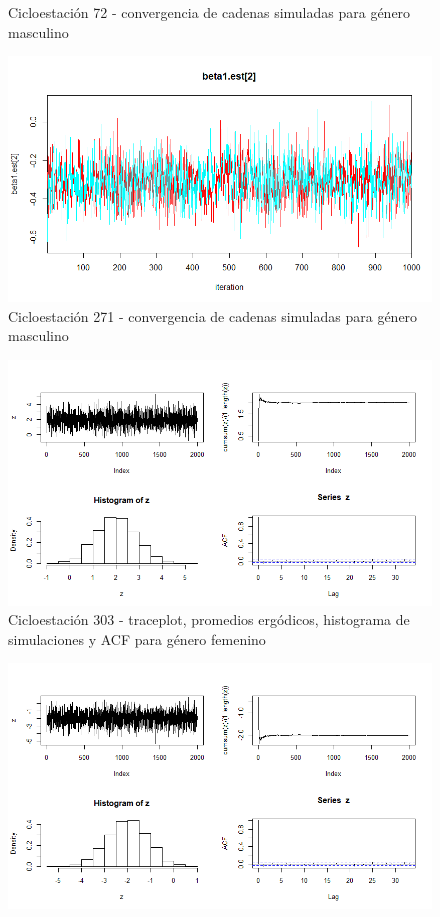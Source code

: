 \documentclass[9pt,twocolumn,twoside]{ilcss}
\begin{document}
\begin{appendices}
\begin{figure}[tbhp]
	\caption{ Cicloestación 72 - convergencia de cadenas simuladas para género masculino}
	\label{fig:72_cadenas_masculino}
\end{figure}
\begin{figure}[tbhp]
	\centering
	\includegraphics[width=0.9\linewidth]{Paper/images/271_cadenas_genero_2hombre.png}
	\caption{ Cicloestación 271 - convergencia de cadenas simuladas para género masculino}
	\label{fig:271_cadenas_masculino}
\end{figure}
\begin{figure}[tbhp]
	\centering
	\includegraphics[width=0.9\linewidth]{Paper/images/303_genero_1mujer.png}
	\caption{ Cicloestación 303 - traceplot, promedios ergódicos, histograma de simulaciones y ACF para género femenino}
	\label{fig:303_traceplot_femenino}
\end{figure}
\begin{figure}[tbhp]
	\centering
	\includegraphics[width=0.9\linewidth]{Paper/images/303_genero_2hombre.png}

\end{figure}
\end{appendices}
\end{document}
